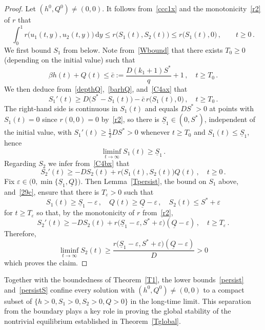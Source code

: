 \documentclass[reqno,11pt]{amsart}
\numberwithin{equation}{section}
\newcommand{\rd}{\mathrm{d}}
\begin{document}
\begin{proof}
Let $(h^0,Q^0)\neq(0,0)$.
It follows from~\eqref{ccc1x} and the monotonicity~\eqref{r2} of $r$ that
\begin{equation}\label{depthQ}
\int_0^1 r\big(u_1(t,y),u_2(t,y)\big)\,\rd y\le r\big(S_1(t),S_2(t)\big)\le r\big(S_1(t),0\big)\,,\qquad t\ge 0\,.
\end{equation}
We first bound $S_1$ from below. Note from~\eqref{Wbound} that there exists $T_0\ge0$ (depending on the initial value) such that
\begin{equation}\label{barhQ}
\beta h(t)+Q(t)\le \bar c:=\frac{D(k_1+1)S^*}{q}+1\,,\quad t\ge T_0\,.
\end{equation}
We then deduce from~\eqref{depthQ},~\eqref{barhQ}, and~\eqref{C4ax} that
\[
S_1'(t)\ge D\big(S^*-S_1(t)\big)-\bar c \, r\big(S_1(t),0\big)\,,\quad t\ge T_0\,.
\]
The right-hand side is continuous in $S_1(t)$ and equals $DS^*>0$ at  points with $S_1(t)=0$ since $r(0,0)=0$
by~\eqref{r2}, so there is $\underline{S}_1\in(0,S^*)$, independent of the initial value, with
$S_1'(t)\ge\tfrac12 DS^*>0$ whenever $t\ge T_0$ and $S_1(t)\le\underline{S}_1$, 
hence
\begin{equation*}
\liminf_{t\to\infty}S_1(t)\ge\underline{S}_1\,.
\end{equation*}
Regarding $S_2$ we infer from~\eqref{C4bx} that
\[
S_2'(t)\ge-DS_2(t)+r\big(S_1(t),S_2(t)\big)Q(t)\,,\quad t\ge0\,.
\]
Fix $\varepsilon\in\big(0,\min\{\underline{S}_1,\underline Q\}\big)$. Then Lemma~\ref{Tpersist}, the bound
on $S_1$ above, and~\eqref{29c}, ensure that there is
$T_\varepsilon>0$ such that
\[
S_1(t)\ge\underline{S}_1-\varepsilon\,,\quad Q(t)\ge\underline Q-\varepsilon\,,\quad
S_2(t)\le S^*+\varepsilon
\]
for $t\ge T_\varepsilon$
so that, by the monotonicity of $r$ from~\eqref{r2},
\[
S_2'(t)\ge-DS_2(t)+r\big(\underline{S}_1-\varepsilon,S^*+\varepsilon\big)(\underline Q-\varepsilon)\,,\quad t\ge T_\varepsilon\,.
\]
Therefore, $$\liminf_{t\to\infty}S_2(t)\ge \frac{r\big(\underline{S}_1-\varepsilon,S^*+\varepsilon\big)(\underline Q-\varepsilon)}{D}>0$$
which proves the claim.
\end{proof}



Together with the boundedness of Theorem~\ref{T1}, the lower bounds~\eqref{persist}
and~\eqref{persistS} confine every solution with $(h^0,Q^0)\neq(0,0)$ to a compact subset of
$\{h>0, S_1>0, S_2>0, Q>0\}$ in the long-time limit. This separation from the boundary plays a key role in proving the global stability of the nontrivial equilibrium established in Theorem~\ref{Tglobal}.
\end{document}
